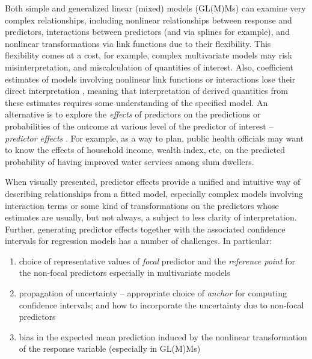 \documentclass[10pt,letterpaper]{article}
\begin{document}
Both simple and generalized linear (mixed) models (GL(M)Ms) can examine very complex relationships, including nonlinear relationships between response and predictors, interactions between predictors (and via splines for example), and nonlinear transformations via link functions due to their flexibility. This flexibility comes at a cost, for example, complex multivariate models may risk misinterpretation, and miscalculation of quantities of interest. Also, coefficient estimates of models involving nonlinear link functions or interactions lose their direct interpretation \cite{leeper2017interpreting}, meaning that interpretation of derived quantities from these estimates requires some understanding of the specified model. An alternative is to explore the \emph{effects} of predictors on the predictions or probabilities of the outcome at various level of the predictor of interest -- \emph{predictor effects} \cite{fox2009effect, leeper2017package, lenth2018package}. For example, as a way to plan, public health officials may want to know the effects of household income, wealth index, etc, on the predicted probability of having improved water services among slum dwellers.


When visually presented, predictor effects provide a unified and intuitive way of describing relationships from a fitted model, especially complex models involving interaction terms or some kind of transformations on the predictors whose estimates are usually, but not always, a subject to less clarity of interpretation. Further, generating predictor effects together with the associated confidence intervals for regression models has a number of challenges. In particular:
\begin{enumerate}
\item choice of representative values of \emph{focal} predictor and the \emph{reference point} for the non-focal predictors especially in multivariate models
\item  propagation of uncertainty -- appropriate choice of \emph{anchor} for computing confidence intervals; and how to incorporate the uncertainty due to non-focal predictors 
\item bias in the expected mean prediction induced by the nonlinear transformation of the response variable (especially in GL(M)Ms)
\end{enumerate}
\end{document}
